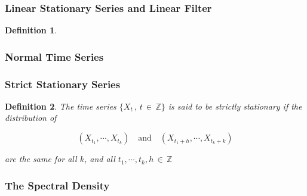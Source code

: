 \documentclass{article}
\newtheorem{Definition}{Definition}
\begin{document}
        \subsubsection{Linear Stationary Series and Linear Filter}

            \begin{Definition}

            \end{Definition}

        \subsubsection{Normal Time Series}

        \subsubsection{Strict Stationary Series}

            \begin{Definition}
                The time series $\{X_t\,,\, t \,\in\, \mathbb{Z}\} $
                is  said to be strictly stationary if the distribution of

                $$(X_{t_1}, \cdots, X_{t_k}) \quad \text{and} \quad (X_{t_1+h}, \cdots, X_{t_k + k})$$
            
                are the same for all $k$, and all $t_1, \cdots, t_k, h \,\in\, \mathbb{Z}$
            \end{Definition}

        \subsubsection{The Spectral Density}

            

        
\end{document}

